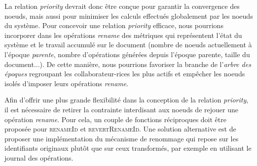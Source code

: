 La relation \emph{priority} devrait donc être conçue pour garantir la convergence des noeuds, mais aussi pour minimiser les calculs effectués globalement par les noeuds du système.
Pour concevoir une relation \emph{priority} efficace, nous pourrions incorporer dans les opérations \emph{rename} des métriques qui représentent l'état du système et le travail accumulé sur le document (nombre de noeuds actuellement à l'époque \emph{parente}, nombre d'opérations générées depuis l'époque parente, taille du document...).
De cette manière, nous pourrions favoriser la branche de l'\emph{arbre des époques} regroupant les collaborateur-rices les plus actifs et empêcher les noeuds isolés d'imposer leurs opérations \emph{rename}.

Afin d'offrir une plus grande flexibilité dans la conception de la relation \emph{priority}, il est nécessaire de retirer la contrainte interdisant aux noeuds de rejouer une opération \emph{rename}.
Pour cela, un couple de fonctions réciproques doit être proposée pour \textsc{renameId} et \textsc{revertRenameId}.
Une solution alternative est de proposer une implémentation du mécanisme de renommage qui repose sur les identifiants originaux plutôt que sur ceux transformés, par exemple en utilisant le journal des opérations.
